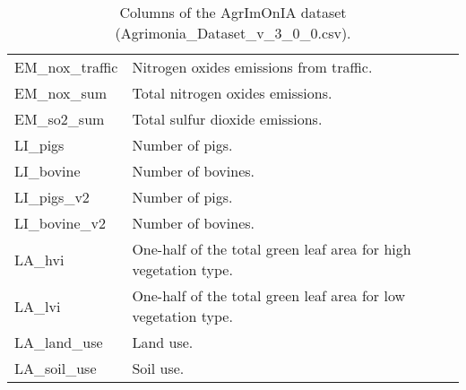 \documentclass[11pt,a4paper]{article}
\begin{document}
\begin{table}[H]
\begin{tabular}{|l|l|}
        EM\_nox\_traffic                & Nitrogen oxides emissions from traffic.                         \\
        EM\_nox\_sum                    & Total nitrogen oxides emissions.                                \\
        EM\_so2\_sum                    & Total sulfur dioxide emissions.                                 \\
        LI\_pigs                        & Number of pigs.                                                 \\
        LI\_bovine                      & Number of bovines.                                              \\
        LI\_pigs\_v2                    & Number of pigs.                                                 \\
        LI\_bovine\_v2                  & Number of bovines.                                              \\
        LA\_hvi                         & One-half of the total green leaf area for high vegetation type. \\ %
        LA\_lvi                         & One-half of the total green leaf area for low vegetation type.  \\ %
        LA\_land\_use                   & Land use.                                                       \\
        LA\_soil\_use                   & Soil use.                                                       \\
        \hline
    \end{tabular}
    \caption{Columns of the AgrImOnIA dataset (Agrimonia\_Dataset\_v\_3\_0\_0.csv).}
    \label{tab:agrimonia_dataset}
\end{table}

\end{document}
